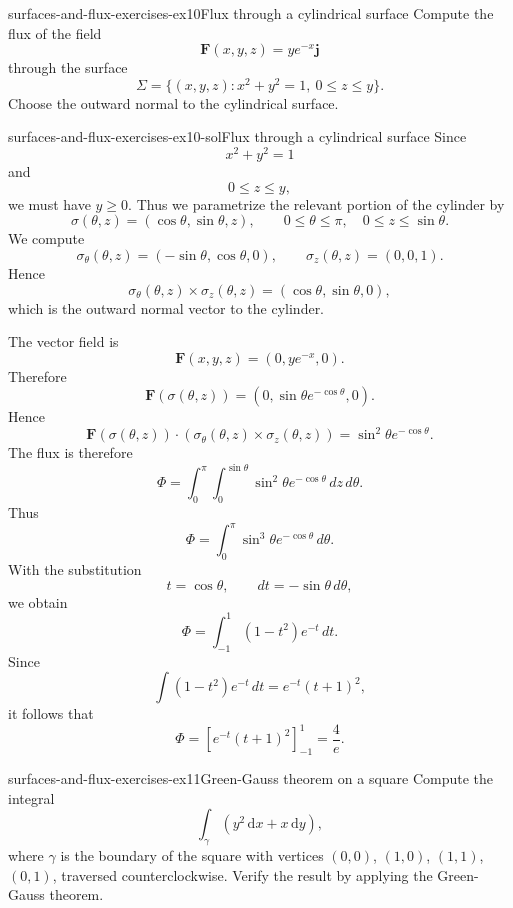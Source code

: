 \documentclass[preview]{standalone}
\begin{document}
\begin{snippetexercise}{surfaces-and-flux-exercises-ex10}{Flux through a cylindrical surface}
    Compute the flux of the field \[\mathbf{F}(x,y,z)=ye^{-x}\mathbf{j}\] through the surface \[\Sigma=\{(x,y,z):x^2+y^2=1,\ 0\leq z\leq y\}.\] Choose the outward normal to the cylindrical surface.
\end{snippetexercise}

\begin{snippetsolution}{surfaces-and-flux-exercises-ex10-sol}{Flux through a cylindrical surface}
    Since
    \[
        x^2+y^2=1
    \]
    and
    \[
        0\leq z\leq y,
    \]
    we must have \(y\geq 0\). Thus we parametrize the relevant portion of the cylinder by
    \[
        \sigma(\theta,z)=(\cos\theta,\sin\theta,z),
        \qquad
        0\leq \theta\leq \pi,\quad
        0\leq z\leq \sin\theta.
    \]
    We compute
    \[
        \sigma_\theta(\theta,z)=(-\sin\theta,\cos\theta,0),
        \qquad
        \sigma_z(\theta,z)=(0,0,1).
    \]
    Hence
    \[
        \sigma_\theta(\theta,z)\times\sigma_z(\theta,z)
        =
        (\cos\theta,\sin\theta,0),
    \]
    which is the outward normal vector to the cylinder.

    The vector field is
    \[
        \mathbf{F}(x,y,z)=(0,ye^{-x},0).
    \]
    Therefore
    \[
        \mathbf{F}(\sigma(\theta,z))
        =
        (0,\sin\theta e^{-\cos\theta},0).
    \]
    Hence
    \[
        \mathbf{F}(\sigma(\theta,z))\cdot
        \left(\sigma_\theta(\theta,z)\times\sigma_z(\theta,z)\right)
        =
        \sin^2\theta e^{-\cos\theta}.
    \]
    The flux is therefore
    \[
        \Phi
        =
        \int_0^\pi
        \int_0^{\sin\theta}
        \sin^2\theta e^{-\cos\theta}
        \,dz\,d\theta.
    \]
    Thus
    \[
        \Phi
        =
        \int_0^\pi
        \sin^3\theta e^{-\cos\theta}
        \,d\theta.
    \]
    With the substitution
    \[
        t=\cos\theta,
        \qquad
        dt=-\sin\theta\,d\theta,
    \]
    we obtain
    \[
        \Phi
        =
        \int_{-1}^1
        (1-t^2)e^{-t}\,dt.
    \]
    Since
    \[
        \int (1-t^2)e^{-t}\,dt
        =
        e^{-t}(t+1)^2,
    \]
    it follows that
    \[
        \Phi
        =
        \left[e^{-t}(t+1)^2\right]_{-1}^1
        =
        \frac{4}{e}.
    \]
\end{snippetsolution}

\begin{snippetexercise}{surfaces-and-flux-exercises-ex11}{Green-Gauss theorem on a square}
    Compute the integral \[\int_{\gamma}\left(y^2\,\mathrm{d}x+x\,\mathrm{d}y\right),\] where \(\gamma\) is the boundary of the square with vertices \((0,0)\), \((1,0)\), \((1,1)\), \((0,1)\), traversed counterclockwise. Verify the result by applying the Green-Gauss theorem.
\end{snippetexercise}
\end{document}
